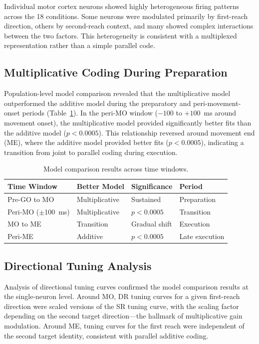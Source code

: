 \documentclass[12pt]{article}
\begin{document}
Individual motor cortex neurons showed highly heterogeneous firing patterns across the 18 conditions. Some neurons were modulated primarily by first-reach direction, others by second-reach context, and many showed complex interactions between the two factors. This heterogeneity is consistent with a multiplexed representation rather than a simple parallel code.

\subsection{Multiplicative Coding During Preparation}

Population-level model comparison revealed that the multiplicative model outperformed the additive model during the preparatory and peri-movement-onset periods (Table~\ref{tab:modelfit}). In the peri-MO window ($-100$ to $+100$~ms around movement onset), the multiplicative model provided significantly better fits than the additive model ($p < 0.0005$). This relationship reversed around movement end (ME), where the additive model provided better fits ($p < 0.0005$), indicating a transition from joint to parallel coding during execution.

\begin{table}[ht]
\centering
\caption{Model comparison results across time windows.}
\label{tab:modelfit}
\begin{tabular}{llll}
\toprule
Time Window & Better Model & Significance & Period \\
\midrule
Pre-GO to MO & Multiplicative & Sustained & Preparation \\
Peri-MO ($\pm$100~ms) & Multiplicative & $p < 0.0005$ & Transition \\
MO to ME & Transition & Gradual shift & Execution \\
Peri-ME & Additive & $p < 0.0005$ & Late execution \\
\bottomrule
\end{tabular}
\end{table}

\subsection{Directional Tuning Analysis}

Analysis of directional tuning curves confirmed the model comparison results at the single-neuron level. Around MO, DR tuning curves for a given first-reach direction were scaled versions of the SR tuning curve, with the scaling factor depending on the second target direction---the hallmark of multiplicative gain modulation. Around ME, tuning curves for the first reach were independent of the second target identity, consistent with parallel additive coding.
\end{document}
